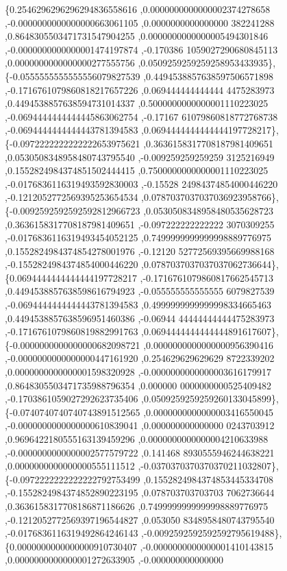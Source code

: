 \begin{DoxyCode}
\{0.2546296296296294836558616 ,0.0000000000000002374278658 ,-0.0000000000000000663061105 ,0.0000000000000000
      382241288 ,0.8648305503471731547904255 ,0.0000000000000005494301846 ,-0.0000000000000001474197874 ,-0.170386
      1059027290680845113 ,0.0000000000000000277555756 ,0.0509259259259258953433935\},
\{-0.0555555555555556079827539 ,0.4494538857638597506571898 ,-0.1716761079860818217657226 ,0.069444444444444
      4475283973 ,0.4494538857638594731014337 ,0.5000000000000001110223025 ,-0.0694444444444445863062754 ,-0.17167
      61079860818772768738 ,-0.0694444444444443781394583 ,0.0694444444444444197728217\},
\{-0.0972222222222222653975621 ,0.3636158317708187981409651 ,0.0530508348958480743795540 ,-0.009259259259259
      3125216949 ,0.1552824984374851502444415 ,0.7500000000000001110223025 ,-0.0176836116319493592830003 ,-0.15528
      24984374854000446220 ,-0.1212052772569395253654534 ,0.0787037037037036923958766\},
\{-0.0092592592592592812966723 ,0.0530508348958480535628723 ,0.3636158317708187981409651 ,-0.097222222222222
      3070309255 ,-0.0176836116319493454052125 ,0.7499999999999998889776975 ,0.1552824984374854278001976 ,-0.12120
      52772569395669988168 ,-0.1552824984374854000446220 ,0.0787037037037037062736644\},
\{0.0694444444444444197728217 ,-0.1716761079860817662545713 ,0.4494538857638598616794923 ,-0.055555555555555
      6079827539 ,-0.0694444444444443781394583 ,0.4999999999999998334665463 ,0.4494538857638596951460386 ,-0.06944
      44444444444475283973 ,-0.1716761079860819882991763 ,0.0694444444444444891617607\},
\{-0.0000000000000000682098721 ,0.0000000000000000956390416 ,-0.0000000000000000447161920 ,0.254629629629629
      8722339202 ,0.0000000000000001598320928 ,-0.0000000000000003616179917 ,0.8648305503471735988796354 ,0.000000
      0000000000525409482 ,-0.1703861059027292623735406 ,0.0509259259259260133045899\},
\{-0.0740740740740743891512565 ,0.0000000000000003416550045 ,-0.0000000000000000610839041 ,0.000000000000000
      0243703912 ,0.9696422180555163139459296 ,0.0000000000000004210633988 ,-0.0000000000000002577579722 ,0.141468
      8930555946244638221 ,0.0000000000000000555111512 ,-0.0370370370370370211032807\},
\{-0.0972222222222222792753499 ,0.1552824984374853445334708 ,-0.1552824984374852890223195 ,0.078703703703703
      7062736644 ,0.3636158317708186871186626 ,0.7499999999999998889776975 ,-0.1212052772569397196544827 ,0.053050
      8348958480743795540 ,-0.0176836116319492864246143 ,-0.0092592592592592795619488\},
\{0.0000000000000000910730407 ,-0.0000000000000001410143815 ,0.0000000000000001272633905 ,-0.000000000000000

\end{DoxyCode}
